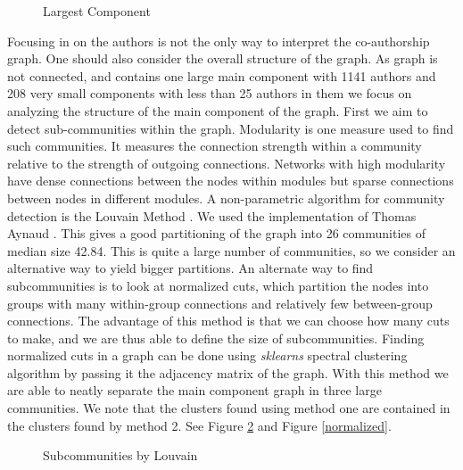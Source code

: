 \documentclass[journal,twocolumn]{IEEEtran}
\begin{document}
    \begin{figure}
        \begin{center}\end{center}
        \caption{Largest Component}
        \label{author_collab_large}
    \end{figure}
    
    Focusing in on the authors is not the only way to interpret the
co-authorship graph. One should also consider the overall structure of
the graph. As graph is not connected, and contains one large main
component with 1141 authors and 208 very small components with less than
25 authors in them we focus on analyzing the structure of the main
component of the graph. First we aim to detect sub-communities within
the graph. Modularity is one measure used to find such communities. It
measures the connection strength within a community relative to the
strength of outgoing connections. Networks with high modularity have
dense connections between the nodes within modules but sparse
connections between nodes in different modules. A non-parametric
algorithm for community detection is the Louvain Method
\cite{blondel2008fast}. We used the implementation of Thomas Aynaud
\cite{louvain}. This gives a good partitioning of the graph into 26
communities of median size 42.84. This is quite a large number of
communities, so we consider an alternative way to yield bigger
partitions. An alternate way to find subcommunities is to look at
normalized cuts, which partition the nodes into groups with many
within-group connections and relatively few between-group connections.
The advantage of this method is that we can choose how many cuts to
make, and we are thus able to define the size of subcommunities. Finding
normalized cuts in a graph can be done using \emph{sklearns} spectral
clustering algorithm by passing it the adjacency matrix of the graph.
With this method we are able to neatly separate the main component graph
in three large communities. We note that the clusters found using method
one are contained in the clusters found by method 2. See Figure
\ref{Louvain} and Figure \ref{normalized}.


    \begin{figure}
        \begin{center}\end{center}
        \caption{Subcommunities by Louvain}
        \label{Louvain}
    \end{figure}
    
\end{document}
